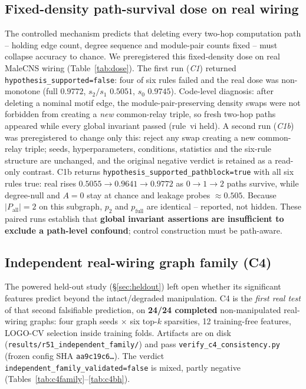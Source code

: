 \documentclass[10pt,twocolumn,letterpaper]{article}
\begin{document}
\subsection{Fixed-density path-survival dose on real wiring}
\label{sec:pathblock}

The controlled mechanism predicts that deleting every two-hop computation
path -- holding edge count, degree sequence and module-pair counts fixed --
must collapse accuracy to chance. We preregistered this fixed-density dose on
real MaleCNS wiring (Table~\ref{tab:dose}). The first run (\emph{C1}) returned
\texttt{hypothesis\_supported=false}: four of six rules failed and the real
dose was non-monotone (full $0.9772$, $s_2/s_1$ $0.5051$, $s_0$ $0.9745$).
Code-level diagnosis: after deleting a nominal motif edge, the
module-pair-preserving density swaps were not forbidden from creating a
\emph{new} common-relay triple, so fresh two-hop paths appeared while every
global invariant passed (rule~vi held). A second run (\emph{C1b}) was
preregistered to change only this: reject any swap creating a new common-relay
triple; seeds, hyperparameters, conditions, statistics and the six-rule
structure are unchanged, and the original negative verdict is retained as a
read-only contrast. C1b returns
\texttt{hypothesis\_supported\_pathblock=true} with all six rules true: real
rises $0.5055 \to 0.9641 \to 0.9772$ as $0 \to 1 \to 2$ paths survive, while
degree-null and $A{=}0$ stay at chance and leakage probes $\approx 0.505$.
Because $|P_{\mathrm{all}}|{=}2$ on this subgraph, $p_2$ and
$p_{\mathrm{full}}$ are identical -- reported, not hidden. These paired runs
establish that \textbf{global invariant assertions are insufficient to exclude
a path-level confound}; control construction must be path-aware.

\subsection{Independent real-wiring graph family (C4)}
\label{sec:c4family}

The powered held-out study (\S\ref{sec:heldout}) left open whether its
significant features predict beyond the intact/degraded manipulation. C4 is
the \emph{first real test} of that second falsifiable prediction, on
\textbf{24/24 completed} non-manipulated real-wiring graphs: four graph seeds
$\times$ six top-$k$ sparsities, 12 training-free features, LOGO-CV selection
inside training folds. Artifacts are on disk
(\texttt{results/r51\_independent\_family/}) and pass
\texttt{verify\_c4\_consistency.py} (frozen config SHA
\texttt{aa9c19c6\ldots}). The verdict
\texttt{independent\_family\_validated=false} is mixed, partly negative
(Tables~\ref{tab:c4family}--\ref{tab:c4bh}).
\end{document}
